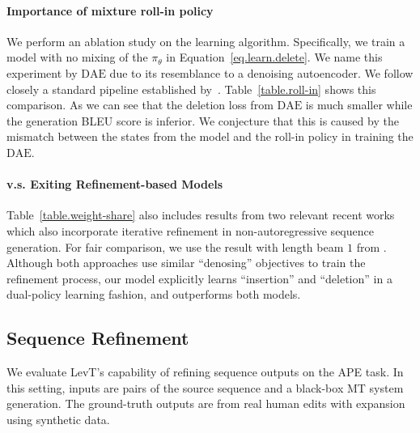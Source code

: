 \documentclass{article}
\begin{document}
\paragraph{Importance of mixture roll-in policy} 
We perform an ablation study on the learning algorithm. Specifically, we train a model with no mixing of the $\pi_\theta$ in Equation~\eqref{eq.learn.delete}. We name this experiment by $\textrm{DAE}$ due to its resemblance to a denoising autoencoder.
We follow closely a standard pipeline established by~\citet{lee2018deterministic}.
Table~\ref{table.roll-in} shows this comparison. As we can see that the deletion loss from $\textrm{DAE}$ is much smaller while the generation BLEU score is inferior.
We conjecture that this is caused by the mismatch between the states from the model and the roll-in policy in training the $\textrm{DAE}$.

\paragraph{v.s. Exiting Refinement-based Models}
Table~\ref{table.weight-share} also includes results from two relevant recent works which also incorporate iterative refinement in non-autoregressive sequence generation.
For fair comparison,  we use the result with length beam $1$ from \citet{levy2019constant}. Although both approaches use similar ``denosing'' objectives to train the refinement process, our model explicitly learns ``insertion'' and ``deletion'' in a dual-policy learning fashion, and outperforms both models.













\subsection{Sequence Refinement}
We evaluate LevT's capability of refining sequence outputs on the APE task. In this setting, inputs are pairs of the source sequence and a black-box MT system generation. The ground-truth outputs are from real human edits with expansion using synthetic data.


\label{sec:seq-ref}
\end{document}
